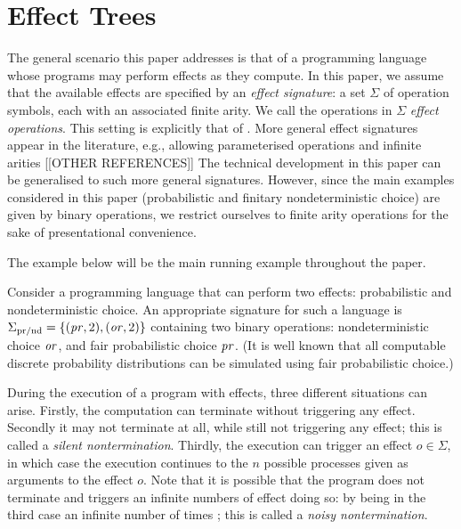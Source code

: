 \section{Effect Trees}
\label{section:trees}

The general scenario this paper addresses is that of a programming language whose programs may perform effects as they compute. In this paper, we assume that the available effects are  specified 
by  an \emph{effect signature}: a set $\Sigma$ of operation symbols, each with an associated finite arity. We call the operations in $\Sigma$ \emph{effect operations}. This setting is explicitly that of \cite{plotkin2001adequacy}.
More general effect signatures appear in the literature, e.g., allowing parameterised operations and infinite arities
\cite{gom} [[OTHER REFERENCES]] The technical development in this paper can be generalised to such
more general signatures. However, since the main examples considered in this paper (probabilistic and finitary nondeterministic choice) are given by binary operations, we restrict ourselves to finite arity operations 
for the sake of presentational convenience.

The example below will be the main running example throughout the paper.
\begin{example}
\label{example:prnd}
    Consider a programming language that can perform two effects: probabilistic and nondeterministic choice.
    An appropriate signature for such a language is 
    $\Sigma_{\text{pr/nd}} = \{ (\operatorname{\mathit{pr}},2), (\operatorname{\mathit{or}},2) \}$ containing two binary operations:
    nondeterministic choice $\operatorname{\mathit{or}}$, 
    and fair probabilistic choice $\operatorname{\mathit{pr}}$. (It is well known that all computable discrete probability distributions can be 
     simulated using fair probabilistic choice.)
 \end{example}

During the execution of a program with effects, three different situations can arise.
Firstly, the computation can terminate without triggering any effect. Secondly
it may not terminate at all, while still not triggering any effect; this is
called a \emph{silent nontermination}. Thirdly,
the execution can trigger an effect $o \in \Sigma$, in which case the execution continues 
to the $n$ possible processes given as arguments to the effect $o$.
Note that it is possible that the program does not terminate and triggers an
infinite numbers of effect doing so: by being in the third case an infinite
number of times ; this is called a \emph{noisy nontermination}.

